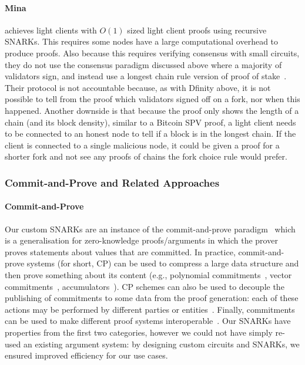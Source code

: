 \paragraph{Mina} achieves light clients with $O(1)$ sized light client proofs using recursive SNARKs. This requires some nodes have a large computational overhead to produce proofs. Also because this requires verifying consensus with small circuits, they do not use the consensus paradigm 
discussed above where a majority of validators sign, and instead use a longest chain rule version of proof of stake~\cite{mina}. 
Their protocol is not accountable because, as with Dfinity above, it is not possible to tell from the proof which validators signed off on a fork, nor when this happened. 
Another downside is that because the proof only shows the length of a chain (and its block density), similar to a Bitcoin SPV proof, a light client needs to be connected to an 
honest node to tell if a block is in the longest chain. If the client is connected to a single malicious node, it could be given a proof for a shorter fork and not see any proofs of chains the fork choice rule would prefer.
\vspace{-0.03cm}
\subsubsection{Commit-and-Prove and Related Approaches}
\label{sec:commit_prove}

\paragraph{Commit-and-Prove} Our custom SNARKs are an instance of the commit-and-prove paradigm~\cite{KilianPhD,CLOS02,CP_proposal,HP_paper} 
which is a generalisation for zero-knowledge proofs/arguments in which the prover proves statements about values that are committed. 
In practice, commit-and-prove systems (for short, CP) can be used to compress a large data structure and then prove something about its content 
(e.g., polynomial commitments~\cite{KZG_10}, vector commitments~\cite{vector_commitment_1}, accumulators~\cite{first_accumulator}). CP schemes can also be used to decouple the publishing of commitments to some data from the proof generation: each of these actions may be performed by different parties or entities~\cite{zkp_reference}. Finally, commitments can be used to make different proof systems interoperable~\cite{CP_paper,interoperability_2}. Our SNARKs have properties from the first two categories, however we could not have simply re-used an existing argument system: by 
designing custom circuits and SNARKs, we ensured improved efficiency for our use cases. \\
\vspace{-0.1in}

